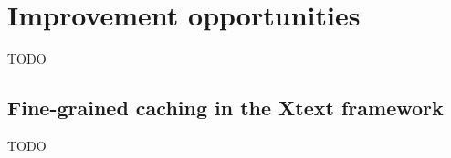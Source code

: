 \documentclass[11pt,a4paper,oneside]{report}
\begin{document}
\section{Improvement opportunities}
TODO

\subsection{Fine-grained caching in the Xtext framework}
TODO


\listoffigures{}
\listoftables{}

\label{page:last}
\end{document}
